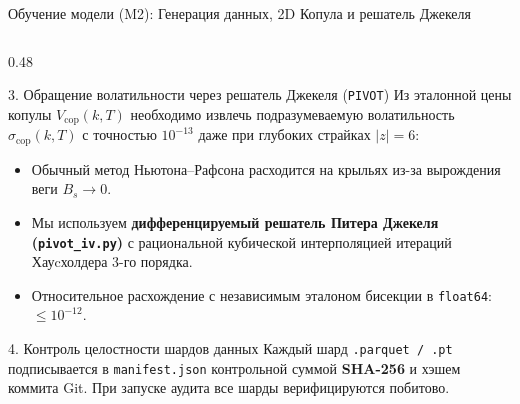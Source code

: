 \documentclass[aspectratio=169, 9pt]{beamer}
\begin{document}
\begin{frame}{Обучение модели (M2): Генерация данных, 2D Копула и решатель Джекеля}
\begin{columns}[T]
    \begin{column}{0.48\textwidth}
      \begin{exampleblock}{3. Обращение волатильности через решатель Джекеля (\texttt{PIVOT})}
        Из эталонной цены копулы $V_{\text{cop}}(k, T)$ необходимо извлечь подразумеваемую волатильность $\sigma_{\text{cop}}(k, T)$ с точностью $10^{-13}$ даже при глубоких страйках $|z| = 6$:
        \begin{itemize}
          \item Обычный метод Ньютона--Рафсона расходится на крыльях из-за вырождения веги $B_s \to 0$.
          \item Мы используем \textbf{дифференцируемый решатель Питера Джекеля (\texttt{pivot\_iv.py})} с рациональной кубической интерполяцией итераций Хауcхолдера 3-го порядка.
          \item Относительное расхождение с независимым эталоном бисекции в \texttt{float64}: \textbf{$\le 10^{-12}$}.
        \end{itemize}
      \end{exampleblock}

      \begin{block}{4. Контроль целостности шардов данных}
        Каждый шард \texttt{.parquet / .pt} подписывается в \texttt{manifest.json} контрольной суммой \textbf{SHA-256} и хэшем коммита Git. При запуске аудита все шарды верифицируются побитово.
      \end{block}
    \end{column}
  \end{columns}
\end{frame}
\end{document}
